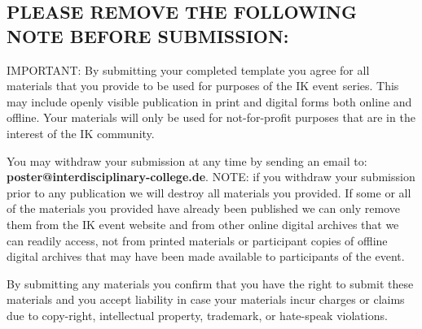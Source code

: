\documentclass[a4paper,fontsize=12pt]{scrartcl}
\begin{document}
\subsection*{\textcolor{green!60!black}{PLEASE REMOVE THE FOLLOWING NOTE BEFORE SUBMISSION:}}

\textcolor{green!60!black}{
IMPORTANT: By submitting your completed template you agree for all materials that you provide to be used for purposes of the IK event series.
This may include openly visible publication in print and digital forms both online and offline.
Your materials will only be used for not-for-profit purposes that are in the interest of the IK community.
}

\textcolor{green!60!black}{
You may withdraw your submission at any time by sending an email to: \textbf{poster@interdisciplinary-college.de}.
NOTE: if you withdraw your submission prior to any publication we will destroy all materials you provided.
If some or all of the materials you provided have already been published we can only remove them from the IK event website and from other online digital archives that we can readily access, not from printed materials or participant copies of offline digital archives that may have been made available to participants of the event.
}

\textcolor{green!60!black}{
By submitting any materials you confirm that you have the right to submit these materials and you accept liability in case your materials incur charges or claims due to copy-right, intellectual property, trademark, or hate-speak violations.
}
\end{document}
